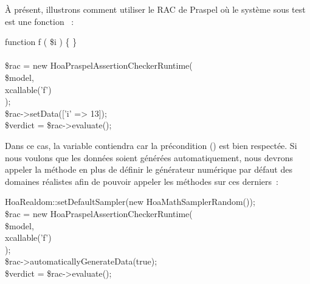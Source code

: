 À présent, illustrons comment utiliser le RAC de Praspel où le système sous test
est une fonction ~:
%
\begin{pre}
function f ( \$i ) \{ \} \\
 \\
\$rac = new Hoa\bslash{}Praspel\bslash{}AssertionChecker\bslash{}Runtime( \\
    \$model, \\
    xcallable('f') \\
); \\
\$rac->setData(['i' => 13]); \\
\$verdict = \$rac->evaluate();
\end{pre}
%
Dans ce cas, la variable  contiendra  car la
précondition () est bien respectée. Si nous voulons
que les données soient générées automatiquement, nous devrons appeler la méthode
 en plus de
définir le générateur numérique par défaut des domaines réalistes afin de
pouvoir appeler les méthodes  sur ces derniers~:
%
\begin{pre}
Hoa\bslash{}Realdom::setDefaultSampler(new Hoa\bslash{}Math\bslash{}Sampler\bslash{}Random()); \\
\$rac = new Hoa\bslash{}Praspel\bslash{}AssertionChecker\bslash{}Runtime( \\
    \$model, \\
    xcallable('f') \\
); \\
\$rac->automaticallyGenerateData(true); \\
\$verdict = \$rac->evaluate();
\end{pre}

